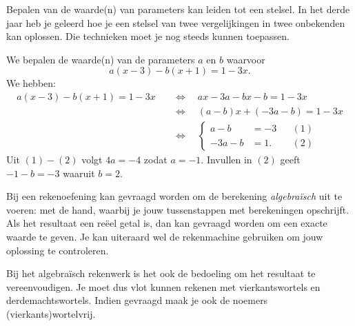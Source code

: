 \documentclass{ximera}
\begin{document}
Bepalen van de waarde(n) van parameters kan leiden tot een stelsel. 
In het derde jaar heb je geleerd hoe je een stelsel van twee vergelijkingen in twee onbekenden kan oplossen. Die technieken moet je nog steeds kunnen toepassen. 

\begin{example} 
We bepalen de waarde(n) van de parameters $a$ en $b$ waarvoor
\[
a(x-3) - b(x+1) = 1-3x.
\]
We hebben:
\begin{align*}
a(x-3) - b(x+1) = 1-3x \quad 
& \Leftrightarrow \quad ax-3a-bx-b=1-3x \\
& \Leftrightarrow \quad (a-b)x +(-3a-b) = 1-3x \\
& \Leftrightarrow \quad
\left\{
\begin{aligned}
a - b & = -3 && (1)\\
-3a - b & = 1. && (2)
\end{aligned}
\right.
\end{align*}
Uit $(1)-(2)$ volgt $4a = -4$ zodat $a = -1$. Invullen in $(2)$ geeft $-1-b =  -3$ waaruit $b = 2$. 
\end{example} 

Bij een rekenoefening kan gevraagd worden om de berekening {\em algebra\"isch} uit te voeren: met de hand, waarbij je jouw tussenstappen met berekeningen opschrijft. Als het resultaat een re\"eel getal is, dan kan gevraagd worden om een exacte waarde te geven. Je kan uiteraard wel de rekenmachine gebruiken om jouw oplossing te controleren. 

Bij het algebra\"isch rekenwerk is het ook de bedoeling om het resultaat te vereenvoudigen. Je moet dus vlot kunnen rekenen met vierkantswortels en derdemachtswortels. 
Indien gevraagd maak je ook de noemers (vierkants)wortelvrij. 
\end{document}
